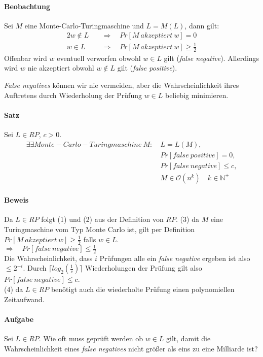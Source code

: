 \paragraph{Beobachtung}
Sei $M$ eine Monte-Carlo-Turingmaschine und $L = M(L)$, dann gilt:
\begin{alignat}{2}
	w \notin L \quad & \Rightarrow \quad Pr[M\ akzeptiert\ w] = 0 \\
	w \in L \quad & \Rightarrow \quad Pr[M\ akzeptiert\ w] \geq \frac{1}{2}
\end{alignat}
Offenbar wird $w$ eventuell verworfen obwohl $w \in L$ gilt (\emph{false negative}).
Allerdings wird $w$ nie akzeptiert obwohl $w \notin L$ gilt (\emph{false positive}).

\emph{False negatives} können wir nie vermeiden, aber die Wahrscheinlichkeit ihres Auftretens durch Wiederholung der Prüfung $w \in L$ beliebig minimieren.

\paragraph{Satz}
Sei $L \in RP$, $c > 0$.
\setcounter{equation}{0}
\begin{alignat}
	\exists \exists Monte-Carlo-Turingmaschine\ M:\ 
	& L = L(M), \\
	& Pr[false\ positive] = 0, \\
	& Pr[false\ negative] \leq c, \\
	& M \in \mathcal{O}(n^k) \quad k \in \mathbb{N}^+ 
\end{alignat}

\paragraph{Beweis}
Da $L \in RP$ folgt (1) und (2) aus der Definition von $RP$.
(3) da $M$ eine Turingmaschine vom Typ Monte Carlo ist, gilt per Definition $Pr[M\ akzeptiert\ w] \geq \frac{1}{2}$ falls $w \in L$. \\
$\Rightarrow \quad Pr[false\ negative] \leq \frac{1}{2}$ \\
Die Wahrscheinlichkeit, dass $i$ Prüfungen alle ein \emph{false negative} ergeben ist also $\leq 2^{-i}$. 
Durch $\lceil log_{2}(\frac{1}{c}) \rceil$ Wiederholungen der Prüfung gilt also $Pr[false\ negative] \leq c$. \\
(4) da $L \in RP$ benötigt auch die wiederholte Prüfung einen polynomiellen Zeitaufwand.

\paragraph{Aufgabe}
Sei $L \in RP$. Wie oft muss geprüft werden ob $w \in L$ gilt, damit die Wahrscheinlichkeit eines \emph{false negatives} nicht größer als eins zu eine Milliarde ist?

